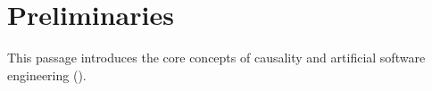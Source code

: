 \chapter{Preliminaries}
\label{ch:preliminaries}

This passage introduces the core concepts of causality and artificial software engineering (\asofte). 









